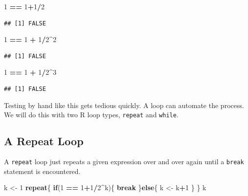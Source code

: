 \documentclass[
]{krantz}
\newenvironment{Shaded}{\begin{snugshade}}{\end{snugshade}}
\newcommand{\ControlFlowTok}[1]{\textcolor[rgb]{0.13,0.29,0.53}{\textbf{#1}}}
\newcommand{\DecValTok}[1]{\textcolor[rgb]{0.00,0.00,0.81}{#1}}
\newcommand{\NormalTok}[1]{#1}
\newcommand{\OperatorTok}[1]{\textcolor[rgb]{0.81,0.36,0.00}{\textbf{#1}}}
\newcommand{\StringTok}[1]{\textcolor[rgb]{0.31,0.60,0.02}{#1}}
\begin{document}
\begin{Shaded}
\begin{Highlighting}[]
\DecValTok{1} \OperatorTok{==}\StringTok{ }\DecValTok{1}\OperatorTok{+}\DecValTok{1}\OperatorTok{/}\DecValTok{2}
\end{Highlighting}
\end{Shaded}

\begin{verbatim}
## [1] FALSE
\end{verbatim}

\begin{Shaded}
\begin{Highlighting}[]
\DecValTok{1} \OperatorTok{==}\StringTok{ }\DecValTok{1} \OperatorTok{+}\StringTok{ }\DecValTok{1}\OperatorTok{/}\DecValTok{2}\OperatorTok{\^{}}\DecValTok{2}
\end{Highlighting}
\end{Shaded}

\begin{verbatim}
## [1] FALSE
\end{verbatim}

\begin{Shaded}
\begin{Highlighting}[]
\DecValTok{1} \OperatorTok{==}\StringTok{ }\DecValTok{1} \OperatorTok{+}\StringTok{ }\DecValTok{1}\OperatorTok{/}\DecValTok{2}\OperatorTok{\^{}}\DecValTok{3}
\end{Highlighting}
\end{Shaded}

\begin{verbatim}
## [1] FALSE
\end{verbatim}

Testing by hand like this gets tedious quickly. A loop can automate the process. We will do this with two R loop types, \texttt{repeat} and \texttt{while}.

\hypertarget{a-repeat-loop}{%
\subsection{A Repeat Loop}\label{a-repeat-loop}}

A \texttt{repeat} loop just repeats a given expression over and over again until a \texttt{break} statement is encountered.

\begin{Shaded}
\begin{Highlighting}[]
\NormalTok{k \textless{}{-}}\StringTok{ }\DecValTok{1}
\ControlFlowTok{repeat}\NormalTok{\{}
    \ControlFlowTok{if}\NormalTok{(}\DecValTok{1} \OperatorTok{==}\StringTok{ }\DecValTok{1}\OperatorTok{+}\DecValTok{1}\OperatorTok{/}\DecValTok{2}\OperatorTok{\^{}}\NormalTok{k)\{}
        \ControlFlowTok{break}
\NormalTok{    \}}\ControlFlowTok{else}\NormalTok{\{}
\NormalTok{        k \textless{}{-}}\StringTok{ }\NormalTok{k}\OperatorTok{+}\DecValTok{1}
\NormalTok{    \}}
\NormalTok{\}}
\NormalTok{k}
\end{Highlighting}
\end{Shaded}
\end{document}
